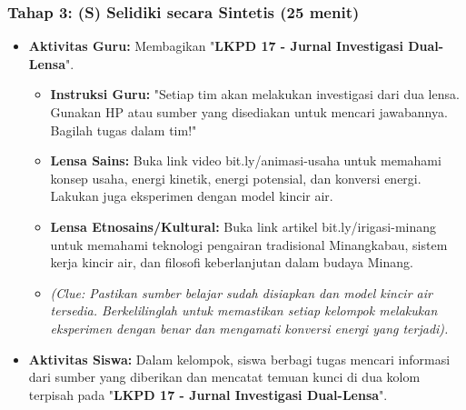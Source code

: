 \documentclass[12pt,a4paper]{article}
\begin{document}
\subsubsection{Tahap 3: (S) Selidiki secara Sintetis (25 menit)}
\begin{itemize}
\item \textbf{Aktivitas Guru:} Membagikan "\textbf{LKPD 17 - Jurnal Investigasi Dual-Lensa}".
    \begin{itemize}
    \item \textbf{Instruksi Guru:} "Setiap tim akan melakukan investigasi dari dua lensa. Gunakan HP atau sumber yang disediakan untuk mencari jawabannya. Bagilah tugas dalam tim!"
    \item \textbf{Lensa Sains:} Buka link video bit.ly/animasi-usaha untuk memahami konsep usaha, energi kinetik, energi potensial, dan konversi energi. Lakukan juga eksperimen dengan model kincir air.
    \item \textbf{Lensa Etnosains/Kultural:} Buka link artikel bit.ly/irigasi-minang untuk memahami teknologi pengairan tradisional Minangkabau, sistem kerja kincir air, dan filosofi keberlanjutan dalam budaya Minang.
    \item \textit{(Clue: Pastikan sumber belajar sudah disiapkan dan model kincir air tersedia. Berkelilinglah untuk memastikan setiap kelompok melakukan eksperimen dengan benar dan mengamati konversi energi yang terjadi).}
    \end{itemize}
\item \textbf{Aktivitas Siswa:} Dalam kelompok, siswa berbagi tugas mencari informasi dari sumber yang diberikan dan mencatat temuan kunci di dua kolom terpisah pada "\textbf{LKPD 17 - Jurnal Investigasi Dual-Lensa}".
\end{itemize}
\end{document}
